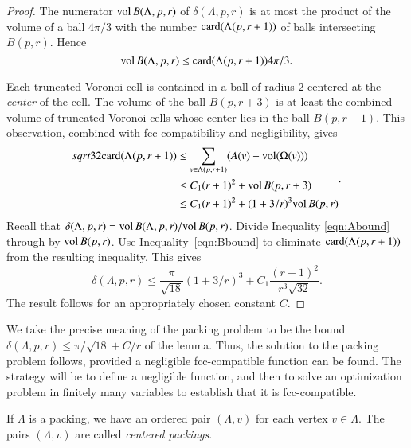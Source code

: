 \begin{proof}
The numerator ${\operatorname{vol}}\, B(\Lambda,p,r)$ of $\delta(\Lambda,p,r)$
is at most the product of the volume of a ball $4\pi/3$ with the
number ${\operatorname{card}}(\Lambda(p,r+1))$ of balls intersecting $B(p,r)$.  Hence
    \begin{equation}
    {\operatorname{vol}}\, B(\Lambda,p,r) \le {\operatorname{card}}(\Lambda(p,r+1)) 4\pi/3.
    \label{eqn:Abound}
    \end{equation}

Each truncated Voronoi cell is contained in a ball of
radius $2$ centered at the {\it center} of the cell.  The volume
of the ball $B(p,r+3)$ is at least the combined volume of 
truncated Voronoi
cells whose center lies in the ball $B(p,r+1)$. This observation,
combined with fcc-compatibility and negligibility, gives
    \begin{equation}
    \begin{split}
    sqrt{32}{\operatorname{card}}(\Lambda(p,r+1))
    &\le \sum_{v\in\Lambda(p,r+1)} (A(v) +
    {\operatorname{vol}}(\Omega(v))) \\
    &\le C_1 (r+1)^2 + {\operatorname{vol}}\,B(p,r+3) \\
    &\le C_1 (r+1)^2 + (1+3/r)^3 {\operatorname{vol}}\,B(p,r)
    \label{eqn:Bbound}
    \end{split}.
    \end{equation}
Recall that $\delta(\Lambda,p,r)=
{\operatorname{vol}}\,B(\Lambda,p,r)/{\operatorname{vol}}\,B(p,r)$. Divide Inequality
\ref{eqn:Abound} through by ${\operatorname{vol}}\,B(p,r)$.  Use
Inequality~\ref{eqn:Bbound} to eliminate ${\operatorname{card}}(\Lambda(p,r+1))$ from the
resulting inequality.  This gives
    $$\delta(\Lambda,p,r)
        \le \frac{\pi}{\sqrt{18}} (1+3/r)^3 + C_1 \frac{(r+1)^2}{r^3\sqrt{32}}.
    $$
The result follows for an appropriately chosen constant $C$.
\end{proof}

\begin{remark} \label{remark:precise}
We take the precise meaning of the packing problem to be the
bound $\delta(\Lambda,p,r) \le \pi/\sqrt{18} + C/r$ of the lemma.
Thus, the solution to the packing problem follows, provided a negligible
fcc-compatible function can be found. The strategy will be to
define a negligible function, and then to solve an optimization
problem in finitely many variables to establish that it is
fcc-compatible.
\end{remark}

If $\Lambda$ is a %
packing, we have an ordered pair
$(\Lambda,v)$ for each vertex $v\in\Lambda$.  The pairs
$(\Lambda,v)$ are called {\it centered packings}.



